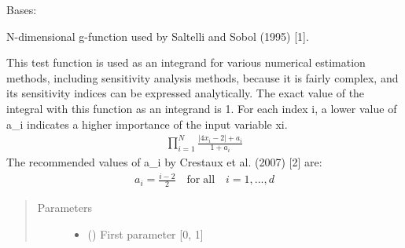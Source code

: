 \documentclass[letterpaper,10pt,english,openany,oneside]{sphinxmanual}
\begin{document}

\begin{fulllineitems}
\label{\detokenize{pygpc.testfunctions:pygpc.testfunctions.testfunctions.GFunction}}
Bases: {\hyperref[\detokenize{pygpc:pygpc.AbstractModel.AbstractModel}]{}}

N-dimensional g-function used by Saltelli and Sobol (1995) {[}1{]}.

This test function is used as an integrand for various numerical
estimation methods, including sensitivity analysis methods, because it
is fairly complex, and its sensitivity indices can be expressed
analytically. The exact value of the integral with this function as an
integrand is 1. For each index i, a lower value of a\_i indicates a higher
importance of the input variable xi.
\begin{equation*}
\begin{split}\prod_{i=1}^{N}\frac{|4 x_i - 2| + a_i}{1 + a_i}\end{split}
\end{equation*}
The recommended values of a\_i by Crestaux et al. (2007) {[}2{]} are:
\begin{equation*}
\begin{split}a_i = \frac{i-2}{2} \quad \mathrm{for\;all} \quad i=1,...,d\end{split}
\end{equation*}\begin{quote}\begin{description}
\item[{Parameters}] \leavevmode\begin{itemize}
\item {} 
\sphinxstyleliteralstrong{\sphinxupquote{{[}}}\sphinxstyleliteralstrong{\sphinxupquote{{]}}} (\sphinxstyleliteralemphasis{\sphinxupquote{ {[}}}\sphinxstyleliteralemphasis{\sphinxupquote{{]}}}) \textendash{} First parameter {[}0, 1{]}


\end{itemize}
\end{description}
\end{quote}
\end{fulllineitems}
\end{document}
